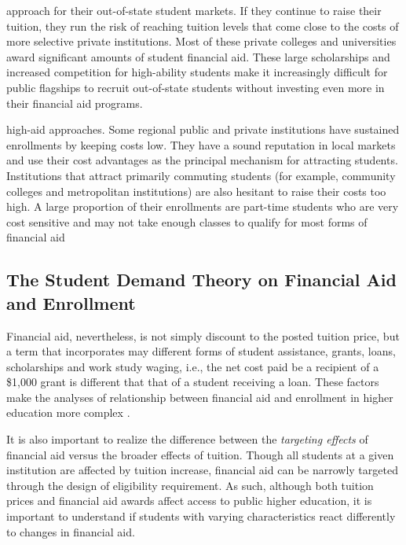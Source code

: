 \documentclass[12pt,english]{report}
\begin{document}
approach for their out-of-state student markets. If they continue to raise
their tuition, they run the risk of reaching tuition levels that come close to
the costs of more selective private institutions. Most of these private
colleges and universities award significant amounts of student financial aid.
These large scholarships and increased competition for high-ability students
make it increasingly difficult for public flagships to recruit out-of-state
students without investing even more in their financial aid programs.

high-aid approaches. Some regional public and private institutions have
sustained enrollments by keeping costs low. They have a sound reputation in
local markets and use their cost advantages as the principal mechanism for
attracting students. Institutions that attract primarily commuting students
(for example, community colleges and metropolitan institutions) are also
hesitant to raise their costs too high. A large proportion of their enrollments
are part-time students who are very cost sensitive and may not take enough
classes to qualify for most forms of financial aid

\subsection{The Student Demand Theory on Financial Aid and Enrollment}
Financial aid, nevertheless, is not simply discount to the posted tuition
price, but  a term that incorporates may different forms of student assistance,
grants, loans, scholarships and work study waging, i.e., the net cost paid be a
recipient of a \$1,000 grant is different that that of a student receiving a
loan.  These factors make the analyses of relationship between financial aid
and enrollment in higher education more complex \citep{Heller1997}.

It is also important to realize the difference between the \textit{targeting
effects}  of financial aid versus the broader effects of tuition. Though all
students at a given institution are affected by tuition increase, financial aid
can be narrowly targeted through the design of eligibility requirement.  As
such, although both tuition prices and financial aid awards affect access to
public higher education, it is important to understand if students with varying
characteristics react differently to changes in financial aid.
\end{document}

